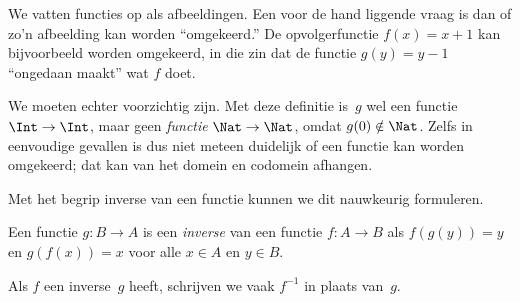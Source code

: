 \documentclass[openany]{memoir}
\begin{document}
\begingroup
\def\olfilename{OLP-0024}
\def\olfilepath{content/sets-functions-relations/functions/}
\hypertarget{unit-OLP-0024}{}




\begin{explain}
We vatten functies op als afbeeldingen. Een voor de hand liggende vraag is
dan of zo'n afbeelding kan worden ``omgekeerd.'' De opvolgerfunctie
$f(x) = x + 1$ kan bijvoorbeeld worden omgekeerd, in die zin dat de
functie $g(y) = y - 1$ ``ongedaan maakt'' wat $f$ doet.

We moeten echter voorzichtig zijn. Met deze definitie is~$g$ wel een
functie $\Int \to \Int$, maar geen \emph{functie} $\Nat \to \Nat$,
omdat $g(0) \notin \Nat$. Zelfs in eenvoudige gevallen is dus niet
meteen duidelijk of een functie kan worden omgekeerd; dat kan van het
domein en codomein afhangen.

Met het begrip inverse van een functie kunnen we dit nauwkeurig formuleren.
\end{explain}

\begin{defn}
Een functie $g \colon B \to A$ is een \emph{inverse} van een functie
$f \colon A \to B$ als $f(g(y)) = y$ en $g(f(x)) = x$ voor alle
$x \in A$ en $y \in B$.
\end{defn}

Als $f$ een inverse~$g$ heeft, schrijven we vaak $f^{-1}$ in plaats
van~$g$.
\end{document}
